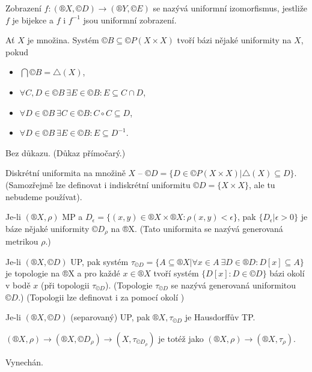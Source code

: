 \documentclass[12pt]{article}					%
\begin{document}
    \begin{definice}
        Zobrazení $f: (®X, ©D) \rightarrow (®Y, ©E)$ se nazývá uniformní izomorfismus, jestliže $f$ je bijekce a $f$ i $f^{-1}$ jsou uniformní zobrazení.
    \end{definice}

    \begin{lemma}
        Ať $X$ je množina. Systém $©B \subseteq ©P(X \times X)$ tvoří bázi nějaké uniformity na $X$, pokud
        \begin{itemize}
            \item $\bigcap ©B = \triangle(X)$,
            \item $\forall C, D \in ©B\ \exists E \in ©B: E \subseteq C \cap D$,
            \item $\forall D \in ©B\ \exists C \in ©B: C \circ C \subseteq D$,
            \item $\forall D \in ©B\ \exists E \in ©B: E \subseteq D^{-1}$.
        \end{itemize}

        \begin{dukazin}
            Bez důkazu. (Důkaz přímočarý.)
        \end{dukazin}
    \end{lemma}

    \begin{priklady}
        Diskrétní uniformita na množině $X$ -- $©D = \{D \in ©P(X \times X)| \triangle(X) \subseteq D\}$. (Samozřejmě lze definovat i indiskrétní uniformitu $©D = \{X \times X\}$, ale tu nebudeme používat).
    \end{priklady}

    \begin{tvrzeni}[Vytvoření UP z MP a TP z UP]
        Je-li $(®X, \rho)$ MP a $D_\epsilon = \{(x, y) \in ®X \times ®X: \rho(x, y) < \epsilon\}$, pak $\{D_\epsilon | \epsilon > 0\}$ je báze nějaké uniformity $©D_\rho$ na ®X. (Tato uniformita se nazývá generovaná metrikou $\rho$.)

        Je-li $(®X, ©D)$ UP, pak systém $\tau_{©D} = \{A \subseteq ®X | \forall x \in A\ \exists D \in ®D: D[x] \subseteq A\}$ je topologie na ®X a pro každé $x \in ®X$ tvoří systém $\{D[x]: D \in ©D\}$ bázi okolí v bodě $x$ (při topologii $\tau_{©D}$). (Topologie $\tau_{©D}$ se nazývá generovaná uniformitou $©D$.) (Topologii lze definovat i za pomocí okolí )

        Je-li $(®X, ©D)$ (separovaný) UP, pak $®X, \tau_{©D}$ je Hausdorffův TP.

        $(®X, \rho) \rightarrow (®X, ©D_\rho) \rightarrow (X, \tau_{©D_\rho})$ je totéž jako $(®X, \rho) \rightarrow (®X, \tau_\rho)$.

        \begin{dukazin}
            Vynechán.
        \end{dukazin}
    \end{tvrzeni}
\end{document}

